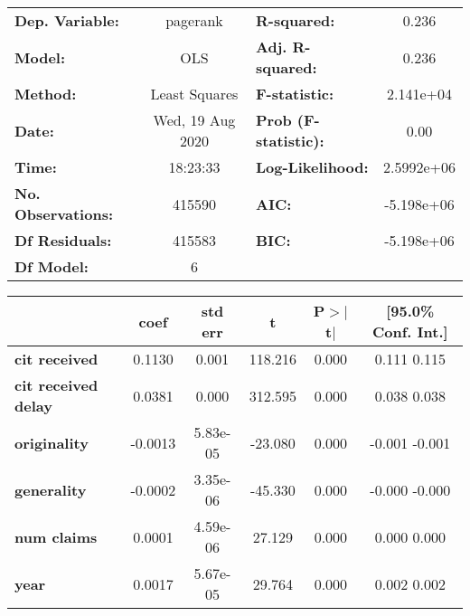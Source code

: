 \begin{center}
\begin{tabular}{lclc}
\toprule
\textbf{Dep. Variable:}     &     pagerank     & \textbf{  R-squared:         } &       0.236     \\
\textbf{Model:}             &       OLS        & \textbf{  Adj. R-squared:    } &       0.236     \\
\textbf{Method:}            &  Least Squares   & \textbf{  F-statistic:       } &   2.141e+04     \\
\textbf{Date:}              & Wed, 19 Aug 2020 & \textbf{  Prob (F-statistic):} &       0.00      \\
\textbf{Time:}              &     18:23:33     & \textbf{  Log-Likelihood:    } &   2.5992e+06    \\
\textbf{No. Observations:}  &      415590      & \textbf{  AIC:               } &   -5.198e+06    \\
\textbf{Df Residuals:}      &      415583      & \textbf{  BIC:               } &   -5.198e+06    \\
\textbf{Df Model:}          &           6      & \textbf{                     } &                 \\
\bottomrule
\end{tabular}
\begin{tabular}{lccccc}
                            & \textbf{coef} & \textbf{std err} & \textbf{t} & \textbf{P$>$$|$t$|$} & \textbf{[95.0\% Conf. Int.]}  \\
\midrule
\textbf{cit received}       &       0.1130  &        0.001     &   118.216  &         0.000        &         0.111     0.115       \\
\textbf{cit received delay} &       0.0381  &        0.000     &   312.595  &         0.000        &         0.038     0.038       \\
\textbf{originality}        &      -0.0013  &     5.83e-05     &   -23.080  &         0.000        &        -0.001    -0.001       \\
\textbf{generality}         &      -0.0002  &     3.35e-06     &   -45.330  &         0.000        &        -0.000    -0.000       \\
\textbf{num claims}         &       0.0001  &     4.59e-06     &    27.129  &         0.000        &         0.000     0.000       \\
\textbf{year}               &       0.0017  &     5.67e-05     &    29.764  &         0.000        &         0.002     0.002       \\

\end{tabular}
\end{center}
